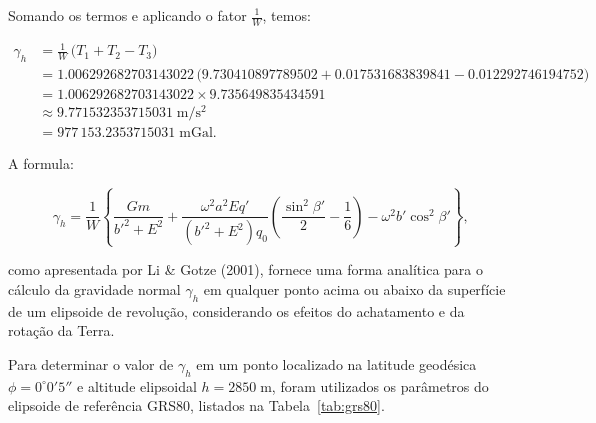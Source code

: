 \noindent
Somando os termos e aplicando o fator \(\frac{1}{W}\), temos:

\[
\begin{aligned}
   \gamma_h &= \frac{1}{W}\,\bigl(T_1 + T_2 - T_3\bigr) \\
   &= 1.006292682703143022 \,\bigl(9.730410897789502 + 0.017531683839841 - 0.012292746194752\bigr)\\
   &= 1.006292682703143022 \times 9.735649835434591 \\
   &\approx \boxed{9.771532353715031\;\mathrm{m/s^2}} \\
   &= 977\,153.2353715031\;\mathrm{mGal}.
\end{aligned}
\]

































A formula:

\[
\gamma_h = \dfrac{1}{W} \left\{ \dfrac{G m}{{b'}^2 + E^2} + \dfrac{\omega^2 a^2 E q'}{({b'}^2 + E^2) q_0} \left(\dfrac{\sin^2 \beta'}{2} - \dfrac{1}{6} \right) - \omega^2 b' \cos^2 \beta' \right\} \text{,}
\]

\noindent
como apresentada por Li \& Gotze (2001), fornece uma forma analítica para o cálculo da gravidade normal \(\gamma_h\) em qualquer ponto acima ou abaixo da superfície de um elipsoide de revolução, considerando os efeitos do achatamento e da rotação da Terra.



Para determinar o valor de \(\gamma_h\) em um ponto localizado na latitude geodésica \(\phi = 0^\circ 0' 5''\) e altitude elipsoidal \(h = 2850\;\text{m}\), foram utilizados os parâmetros do elipsoide de referência GRS80, listados na Tabela~\ref{tab:grs80}.

